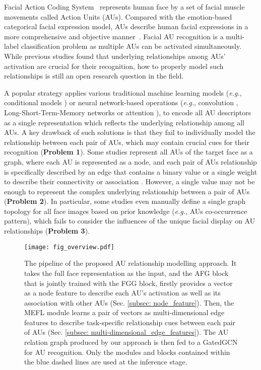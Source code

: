 \documentclass{article}
\begin{document}
\noindent Facial Action Coding System~\cite{friesen1978facial} represents human face by a set of facial muscle movements called Action Units (AUs). Compared with the emotion-based categorical facial expression model, AUs describe human facial expressions in a more comprehensive and objective manner~\cite{martinez2017automatic}. Facial AU recognition is a multi-label classification problem as multiple AUs can be activated simultaneously. While previous studies found that underlying relationships among AUs' activation \cite{corneanu2018deep,Song_2021_CVPR,shao2021jaa} are crucial for their recognition, how to properly model such relationships is still an open research question in the field.


A popular strategy applies various traditional machine learning models (\emph{e.g.},  conditional models \cite{eleftheriadis2015multi}) or neural network-based operations (\emph{e.g.}, convolution \cite{zhao2016deep}, Long-Short-Term-Memory networks \cite{niu2019local} or attention \cite{shao2021jaa}), to encode all AU descriptors as a single representation which reflects the underlying relationship among all AUs. A key drawback of such solutions is that they fail to individually model the relationship between each pair of AUs, which may contain crucial cues for their recognition (\textbf{Problem 1}). Some studies represent all AUs of the target face as a graph, where each AU is represented as a node, and each pair of AUs relationship is specifically described by an edge that contains a binary value or a single weight to describe their connectivity or association \cite{song2021uncertain,Song_2021_CVPR}. However, a single value may not be enough to represent the complex underlying relationship between a pair of AUs (\textbf{Problem 2}). In particular, some studies \cite{li2019semantic,liu2020relation} even manually define a single graph topology for all face images based on prior knowledge (\emph{e.g.}, AUs co-occurrence pattern), which fails to consider the influences of the unique facial display on AU relationships (\textbf{Problem 3}).


\begin{figure*}[t]
  \centering
  \texttt{[image: fig\_overview.pdf]}
  \caption{The pipeline of the proposed AU relationship modelling approach. It takes the full face representation  as the input, and the AFG block that is jointly trained with the FGG block, firstly provides a vector as a node feature to describe each AU's activation as well as its association with other AUs (Sec. \ref{subsec: node_feature}). Then, the MEFL module learns a pair of vectors as multi-dimensional edge features to describe task-specific relationship cues between each pair of AUs (Sec. \ref{subsec: multi-dimensional_edge_features}). The AU relation graph produced by our approach is then fed to a GatedGCN for AU recognition. Only the modules and blocks contained within the blue dashed lines are used at the inference stage.}
\label{fig:method_overview}
\end{figure*}
\end{document}
